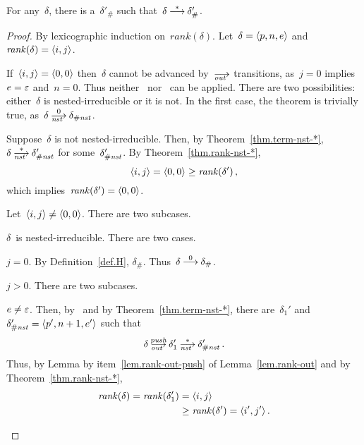 
\begin{theorem}
  \label{thm.term}
  For any~$\delta$, there is a~$\delta'_\#$ such
  that~$\delta\trans[*]\delta'_\#$.
\end{theorem}
\begin{proof}
  By lexicographic induction on~$rank(\delta)$.  Let~$\delta=\<p,n,e>$ and
  $\rank(\delta)=\<i,j>$.
  \begin{basis}
    If~$\<i,j>=\<0,0>$ then~$\delta$ cannot be advanced by~$\out$
    transitions, as~$j=0$ implies~$e=\varepsilon$ and~$n=0$.  Thus neither~
    nor~ can be applied.  There are two possibilities:
    either~$\delta$ is nested-irreducible or it is not.  In the first case,
    the theorem is trivially true, as~$\delta\nst[0]\delta_\Hnst$.

    Suppose~$\delta$ is not nested-irreducible.  Then, by
    Theorem~\ref{thm.term-nst-*}, $\delta\nst[*]\delta'_\Hnst$ for
    some~$\delta'_{\#\mathit{nst}}$.  By Theorem~\ref{thm.rank-nst-*},
    \[
      \<i,j>=\<0,0>\ge\rank(\delta')\,,
    \]
    which implies~$\rank(\delta')=\<0,0>$.
  \end{basis}
  \begin{induction}
    Let~$\<i,j>\ne\<0,0>$.
    There are two subcases.
    \begin{case}
      \label{thm.term.Hnst}
      $\delta$~is nested-irreducible.
      There are two cases.
      \begin{subcase}
        \label{thm.term.Hnst-j0}
        $j=0$.  By Definition~\ref{def.H}, $\delta_\#$.
        Thus~$\delta\trans[0]\delta_\#$.
      \end{subcase}
      \begin{subcase}
        \label{thm.term.Hnst-j>0}
        $j>0$.
        There are two subcases.
        \begin{subsubcase}
          \label{thm.term.Hnst-j>0-nonnil}
          $e\ne\varepsilon$.
          Then, by~ and by Theorem~\ref{thm.term-nst-*}, there
          are~$\delta_1'$ and~$\delta'_\Hnst=\<p',n+1,e'>$ such that
          \[
            \delta\outpush\delta_1'\nst[*]\delta'_\Hnst\,.
          \]
          Thus, by Lemma by item~\eqref{lem.rank-out-push} of
          Lemma~\ref{lem.rank-out} and by Theorem~\ref{thm.rank-nst-*},
          \begin{align*}
            \rank(\delta)=\rank(\delta_1')&=\<i,j>\\
                                          &\ge\rank(\delta')=\<i',j'>\,.
          \end{align*}

\end{subsubcase}
\end{subcase}
\end{case}
\end{induction}
\end{proof}
